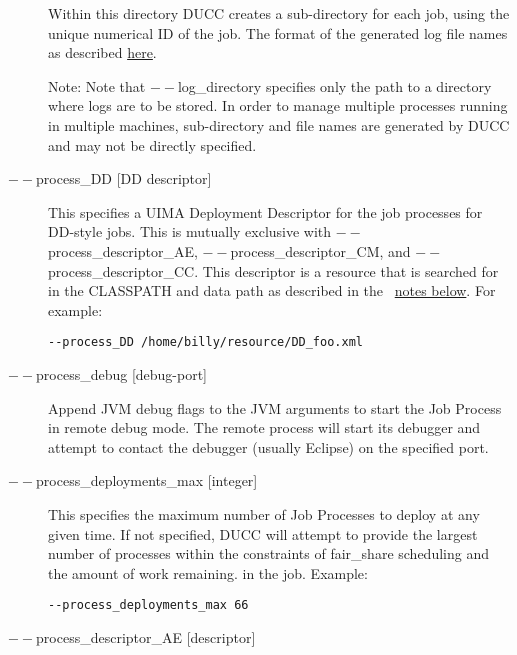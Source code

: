 \begin{description}
             Within this directory DUCC creates a sub-directory for each job, using the unique numerical 
             ID of the job. The format of the generated log file names as described
             \hyperref[chap:job-logs]{here}.
             
             Note: Note that $--$log\_directory specifies only the path to a directory where 
             logs are to be stored. In order to manage multiple processes running in multiple 
             machines, sub-directory and file names are generated by DUCC and may 
             not be directly specified. 

           \item[$--$process\_DD {[DD descriptor]}  ]

             This specifies a UIMA Deployment Descriptor for the job processes for DD-style jobs. 
             This is mutually exclusive with $--$process\_descriptor\_AE, $--$process\_descriptor\_CM, 
             and $--$process\_descriptor\_CC. This descriptor is a resource that is searched for in the 
             CLASSPATH and data path as described in the ~\hyperref[par:cli.submit.notes]{notes below}.
             For example:
             \begin{verbatim}
--process_DD /home/billy/resource/DD_foo.xml 
             \end{verbatim}

           \item[$--$process\_debug {[debug-port]}] Append JVM debug flags to the JVM
             arguments to start the Job Process in remote debug mode.  The remote process will start
             its debugger and attempt to contact the debugger (usually Eclipse) on the specified
             port.
             
           \item[$--$process\_deployments\_max {[integer]} ]

             This specifies the maximum number of Job Processes to deploy at any given time. If not 
             specified, DUCC will attempt to provide the largest number of processes within the 
             constraints of fair\_share scheduling and the amount of work remaining.
             in the job. Example:
             \begin{verbatim}
--process_deployments_max 66 
             \end{verbatim}


           \item[$--$process\_descriptor\_AE {[descriptor]}  ]


\end{description}
